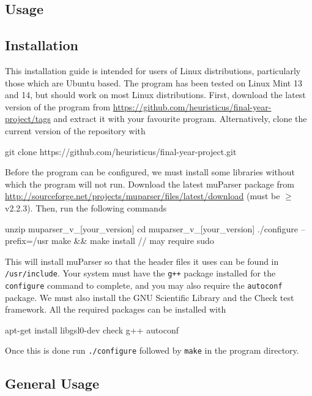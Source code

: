\documentclass[a4paper,11pt,twoside]{article}
\begin{document}
   \newpage
   \printbibliography
   \newpage
\begin{appendices}
\section{Usage}
\label{sec-10}
\subsection{Installation}
\label{sec-10-1}

   This installation guide is intended for users of Linux distributions,
   particularly those which are Ubuntu based. The program has been tested on
   Linux Mint 13 and 14, but should work on most Linux distributions. First,
   download the latest version of the program from
   \href{https://github.com/heuristicus/final-year-project/tags}{https://github.com/heuristicus/final-year-project/tags} and extract it with
   your favourite program. Alternatively, clone the current version of the
   repository with 
   \begin{verbatimtab} 
   git clone https://github.com/heuristicus/final-year-project.git
   \end{verbatimtab}
   Before the program can be configured, we must install some libraries without
   which the program will not run. Download the latest muParser package from
   \href{http://sourceforge.net/projects/muparser/files/latest/download}{http://sourceforge.net/projects/muparser/files/latest/download} (must be
   $\geq$ v2.2.3). Then, run the following commands
   \begin{verbatimtab}
   unzip muparser_v_[your_version]
   cd muparser_v_[your_version]
   ./configure --prefix=/usr
   make && make install // may require sudo
   \end{verbatimtab}
   This will install muParser so that the header files it uses can be found in
   \texttt{/usr/include}. Your system must have the \texttt{g++} package
   installed for the \texttt{configure} command to complete, and you may also
   require the \texttt{autoconf} package. We must also install the GNU
   Scientific Library and the Check test framework. All the required packages
   can be installed with
   \begin{verbatimtab}
   apt-get install libgsl0-dev check g++ autoconf
   \end{verbatimtab}
   Once this is done run \texttt{./configure} followed by \texttt{make} in the
   program directory.
\subsection{General Usage}
\label{sec-10-2}


\end{appendices}
\end{document}
